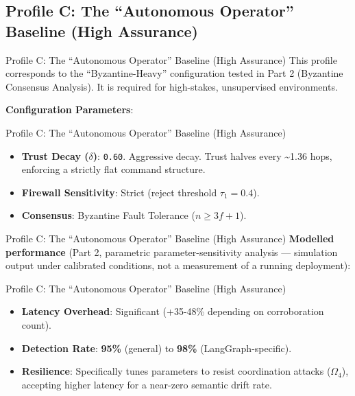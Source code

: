 \documentclass[
  ignorenonframetext,
]{beamer}
\providecommand{\tightlist}{%
  \setlength{\itemsep}{0pt}\setlength{\parskip}{0pt}}
\begin{document}
\subsection{Profile C: The ``Autonomous Operator'' Baseline (High
Assurance)}\label{profile-c-the-autonomous-operator-baseline-high-assurance}

\begin{frame}{Profile C: The ``Autonomous
Operator'' Baseline (High Assurance)}
This profile corresponds to the ``Byzantine-Heavy'' configuration tested
in Part 2 (Byzantine Consensus Analysis). It is required for
high-stakes, unsupervised environments.

\textbf{Configuration Parameters}:

\end{frame}

\begin{frame}{Profile C: The ``Autonomous
Operator'' Baseline (High Assurance)}
\begin{itemize}
\tightlist
\item
  \textbf{Trust Decay (\(\delta\))}: \texttt{0.60}. Aggressive decay.
  Trust halves every \textasciitilde1.36 hops, enforcing a strictly flat
  command structure.
\item
  \textbf{Firewall Sensitivity}: Strict (reject threshold
  \(\tau_1 =0.4\)).
\item
  \textbf{Consensus}: Byzantine Fault Tolerance (\(n \ge 3f+1\)).
\end{itemize}

\end{frame}

\begin{frame}{Profile C: The ``Autonomous
Operator'' Baseline (High Assurance)}
\textbf{Modelled performance} (Part 2, parametric parameter-sensitivity
analysis --- simulation output under calibrated conditions, not a
measurement of a running deployment):

\end{frame}

\begin{frame}{Profile C: The ``Autonomous
Operator'' Baseline (High Assurance)}
\begin{itemize}
\tightlist
\item
  \textbf{Latency Overhead}: Significant (+35-48\% depending on
  corroboration count).
\item
  \textbf{Detection Rate}: \textbf{95\%} (general) to \textbf{98\%}
  (LangGraph-specific).
\item
  \textbf{Resilience}: Specifically tunes parameters to resist
  coordination attacks (\(\Omega_4\)), accepting higher latency for a
  near-zero semantic drift rate.
\end{itemize}
\end{frame}
\end{document}
